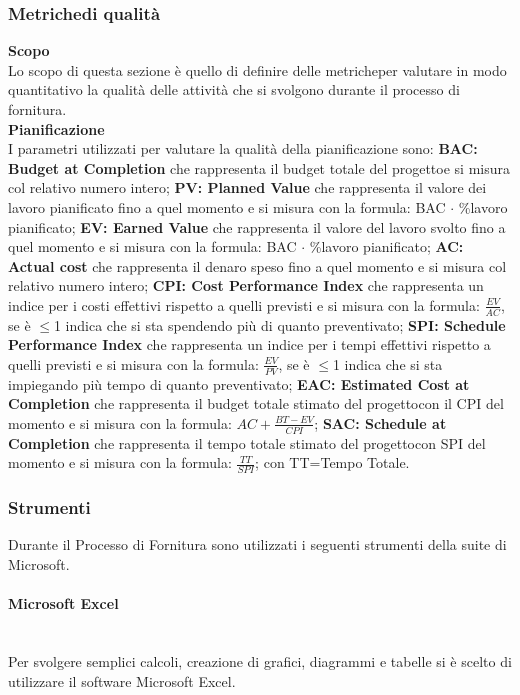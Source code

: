 \subsubsection{Metriche\glosp di qualità}
\textbf{Scopo}\\
Lo scopo di questa sezione è quello di definire delle metriche\glosp per valutare in modo quantitativo la qualità delle attività che si svolgono durante il processo di fornitura.
\\\textbf{Pianificazione}\\
I parametri utilizzati per valutare la qualità della pianificazione sono:
\textbf{BAC: Budget at Completion} che rappresenta il budget totale del progetto\glosp e si misura col relativo numero intero;
\textbf{PV: Planned Value} che rappresenta il valore dei lavoro pianificato fino a quel momento e si misura con la formula: BAC $\cdot$ \%lavoro pianificato;
\textbf{EV: Earned Value} che rappresenta il valore del lavoro svolto fino a quel momento e si misura con la formula: BAC $\cdot$ \%lavoro pianificato;
\textbf{AC: Actual cost} che rappresenta il denaro speso fino a quel momento e si misura col relativo numero intero;
\textbf{CPI: Cost Performance Index} che rappresenta un indice per i costi effettivi rispetto a quelli previsti e si misura con la formula: $\frac{EV}{AC}$, se è $\le$1 indica che si sta spendendo più di quanto preventivato;
\textbf{SPI: Schedule Performance Index} che rappresenta un indice per i tempi effettivi rispetto a quelli previsti e si misura con la formula: $\frac{EV}{PV}$, se è $\le$1 indica che si sta impiegando più tempo di quanto preventivato;
\textbf{EAC: Estimated Cost at Completion} che rappresenta il budget totale stimato del progetto\glosp con il CPI del momento e si misura con la formula: $AC+\frac{BT-EV}{CPI}$;
\textbf{SAC: Schedule at Completion} che rappresenta il tempo totale stimato del progetto\glosp con SPI del momento e si misura con la formula: $\frac{TT}{SPI}$; con TT=Tempo Totale.
\subsubsection{Strumenti}
Durante il Processo di Fornitura sono utilizzati i seguenti strumenti della suite di Microsoft.
\paragraph{Microsoft Excel}\mbox{}\\ [1mm]
Per svolgere semplici calcoli, creazione di grafici, diagrammi e tabelle si è scelto di utilizzare il software Microsoft Excel.
